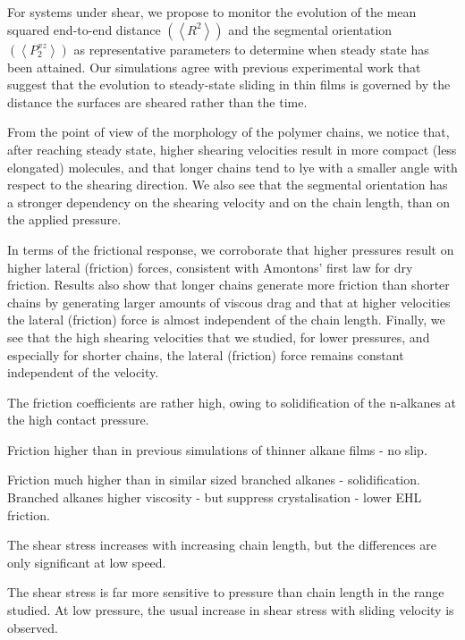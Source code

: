 \documentclass[aps,prb,reprint,superscriptaddress, a4paper]{revtex4-1}
\begin{document}
For systems under shear, we propose to monitor the evolution of the mean squared end-to-end distance $\left(\left< R^2 \right> \right)$ and the segmental orientation $\left(\left<P_{2}^{xz} \right> \right)$ as representative parameters to determine when steady state has been attained. Our simulations  agree with previous experimental work that suggest\cite{Drummond2000} that the  evolution to steady-state sliding in thin films is governed by the distance the surfaces are sheared rather than the time.

From the point of view of the morphology of the polymer chains, we notice that, after reaching steady state, higher shearing velocities result in more compact (less elongated) molecules, and that longer chains tend to  lye  with a smaller angle with respect to the shearing direction.  We also see that the segmental orientation has a stronger dependency on the shearing velocity and on the chain length, than on the applied pressure.

In terms of the frictional response, we corroborate that higher pressures result on higher lateral (friction) forces, consistent with Amontons' first law for dry friction. Results also show that longer chains generate more friction than shorter chains by  generating larger amounts of viscous drag and that at higher velocities the  lateral (friction) force is almost independent of the chain length. Finally, we see that the high shearing velocities that we studied, for lower pressures, and especially for shorter chains, the lateral (friction) force remains constant independent of the velocity.

The friction coefficients are rather high, owing to solidification of the n-alkanes at the high contact pressure.

Friction higher than in previous simulations of thinner alkane films - no slip.

Friction much higher than in similar sized branched alkanes - solidification. Branched alkanes higher viscosity - but suppress crystalisation - lower EHL friction.

The shear stress increases with increasing chain length, but the differences are only significant at low speed.

The shear stress is far more sensitive to pressure than chain length in the range studied. At low pressure, the usual increase in shear stress with sliding velocity is observed. 

\end{document}
